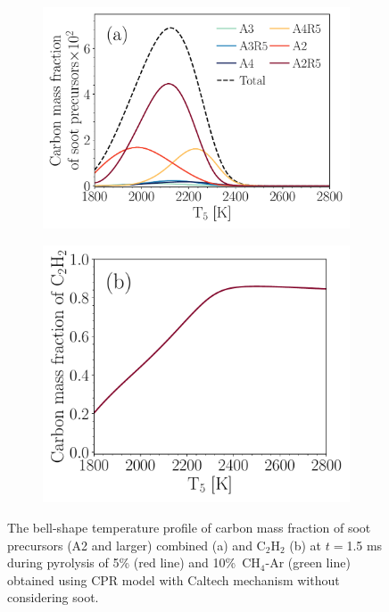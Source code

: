 \begin{figure}[H]
	\centering
	\begin{subfigure}[t]{0.4\textwidth}
		\includegraphics[width=1\textwidth]{Figures/Results/Shocktube/Agafonov2016_cpr/SPC_cmf_separate.pdf}
	\end{subfigure}
	\begin{subfigure}[t]{0.36\textwidth}
		\includegraphics[width=1\textwidth]{Figures/Results/Shocktube/Agafonov2016_cpr/C2H2_cmf.pdf}
	\end{subfigure}
	\caption{The bell-shape temperature profile of carbon mass fraction of soot precursors (A2 and larger) combined (a) and $\mathrm{C_2H_2}$ (b) at $t=$1.5 ms during pyrolysis of 5\% (red line) and 10\%~$\mathrm{CH_4}$-Ar (green line) obtained using CPR model with Caltech mechanism without considering soot.}
	\label{fig:SPC_cmf_cpr} 
\end{figure}





